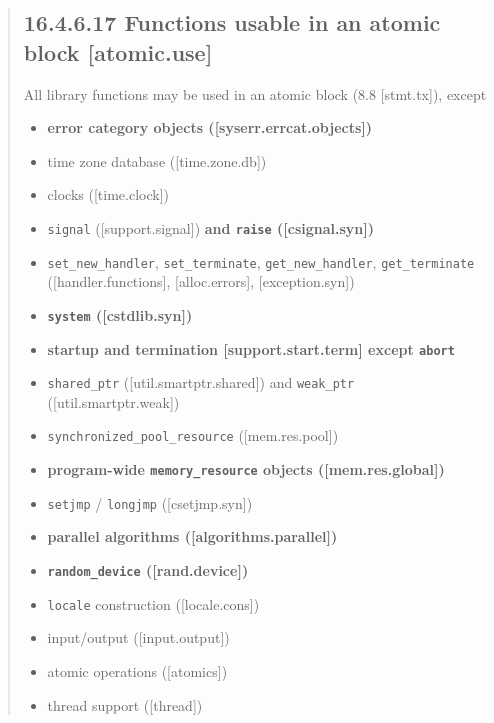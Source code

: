 \begin{quote}
\hypertarget{functions-usable-in-an-atomic-block-atomic.use}{%
\subsection{16.4.6.17 Functions usable in an atomic block
{[}atomic.use{]}}\label{functions-usable-in-an-atomic-block-atomic.use}}

All library functions may be used in an atomic block (8.8
{[}stmt.tx{]}), except

\begin{itemize}
\tightlist
\item
  \textbf{error category objects ({[}syserr.errcat.objects{]})}
\item
  time zone database ({[}time.zone.db{]})
\item
  clocks ({[}time.clock{]})
\item
  \texttt{signal} ({[}support.signal{]}) \textbf{and \texttt{raise}
  ({[}csignal.syn{]})}
\item
  \texttt{set\_new\_handler}, \texttt{set\_terminate},
  \texttt{get\_new\_handler}, \texttt{get\_terminate}
  ({[}handler.functions{]}, {[}alloc.errors{]}, {[}exception.syn{]})
\item
  \textbf{\texttt{system} ({[}cstdlib.syn{]})}
\item
  \textbf{startup and termination {[}support.start.term{]} except
  \texttt{abort}}
\item
  \texttt{shared\_ptr} ({[}util.smartptr.shared{]}) and
  \texttt{weak\_ptr} ({[}util.smartptr.weak{]})
\item
  \texttt{synchronized\_pool\_resource} ({[}mem.res.pool{]})
\item
  \textbf{program-wide \texttt{memory\_resource} objects
  ({[}mem.res.global{]})}
\item
  \texttt{setjmp} / \texttt{longjmp} ({[}csetjmp.syn{]})
\item
  \textbf{parallel algorithms ({[}algorithms.parallel{]})}
\item
  \textbf{\texttt{random\_device} ({[}rand.device{]})}
\item
  \texttt{locale} construction ({[}locale.cons{]})
\item
  input/output ({[}input.output{]})
\item
  atomic operations ({[}atomics{]})
\item
  thread support ({[}thread{]})
\end{itemize}
\end{quote}

